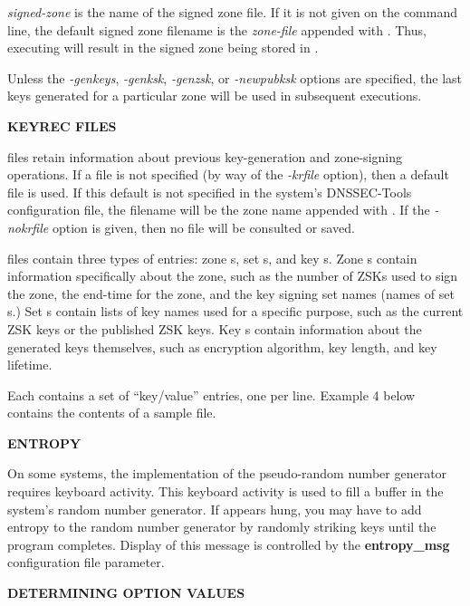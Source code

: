{\it signed-zone} is the name of the signed zone file.  If it is not given on
the command line, the default signed zone filename is the {\it zone-file}
appended with .  Thus, executing 
will result in the signed zone being stored in .

Unless the {\it -genkeys}, {\it -genksk}, {\it -genzsk}, or {\it -newpubksk}
options are specified, the last keys generated for a particular zone will be
used in subsequent  executions.

{\bf KEYREC FILES}

 files retain information about previous key-generation and
zone-signing operations.  If a  file is not specified (by way
of the {\it -krfile} option), then a default  file is used.  If
this default is not specified in the system's DNSSEC-Tools configuration file,
the filename will be the zone name appended with .  If the {\it
-nokrfile} option is given, then no  file will be consulted or
saved.

 files contain three types of entries:  zone s,
set s, and key s.  Zone s contain
information specifically about the zone, such as the number of ZSKs used to
sign the zone, the end-time for the zone, and the key signing set names (names
of set s.) Set s contain lists of key
 names used for a specific purpose, such as the current ZSK
keys or the published ZSK keys.  Key s contain information
about the generated keys themselves, such as encryption algorithm, key length,
and key lifetime.

Each  contains a set of ``key/value'' entries, one per line.
Example 4 below contains the contents of a sample  file.

{\bf ENTROPY}

On some systems, the implementation of the pseudo-random number generator
requires keyboard activity.  This keyboard activity is used to fill a buffer
in the system's random number generator.  If  appears hung,
you may have to add entropy to the random number generator by randomly
striking keys until the program completes.  Display of this message is
controlled by the {\bf entropy\_msg} configuration file parameter.

{\bf DETERMINING OPTION VALUES}


